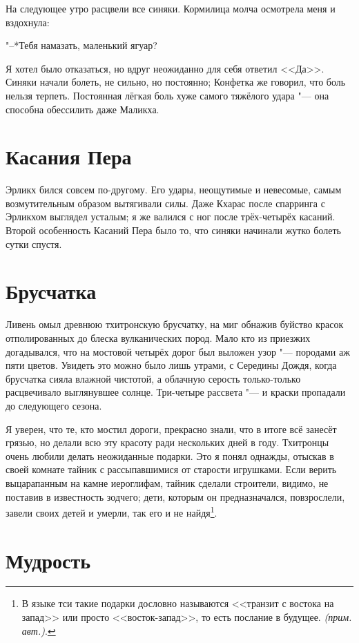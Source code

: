 \documentclass[a4paper,10pt]{book}
\newcommand{\authornote}{\textit{(прим. авт.)}}
\begin{document}
 На следующее утро расцвели все синяки. Кормилица молча осмотрела меня и вздохнула:

"--*Тебя намазать, маленький ягуар?

Я хотел было отказаться, но вдруг неожиданно для себя ответил <<Да>>.
Синяки начали болеть, не сильно, но постоянно;
Конфетка же говорил, что боль нельзя терпеть. Постоянная лёгкая боль хуже самого тяжёлого удара "--- она способна обессилить даже Маликха.

 
 \section{Касания Пера}

 Эрликх бился совсем по-другому. Его удары, неощутимые и невесомые, самым возмутительным образом вытягивали силы. Даже Кхарас после спарринга с Эрликхом выглядел усталым; я же валился с ног после трёх-четырёх касаний. Второй особенность Касаний Пера было то, что синяки начинали жутко болеть сутки спустя.

 
 \section{Брусчатка}

Ливень омыл древнюю тхитронскую брусчатку, на миг обнажив буйство красок отполированных 
до блеска вулканических пород. Мало кто из приезжих догадывался, что на мостовой 
четырёх дорог был выложен узор "--- породами аж пяти цветов. Увидеть это 
можно было лишь утрами, с Середины Дождя, когда брусчатка сияла влажной 
чистотой, а облачную серость только-только расцвечивало выглянувшее солнце. Три-четыре 
рассвета "--- и краски пропадали до следующего сезона.

Я уверен, что те, кто мостил дороги, прекрасно знали, что в итоге всё занесёт грязью, но делали всю эту красоту ради нескольких дней в году. Тхитронцы очень любили делать неожиданные подарки. Это я понял однажды, отыскав в своей комнате  тайник с рассыпавшимися от старости игрушками. Если верить выцарапанным на камне иероглифам, тайник сделали строители, видимо, не поставив в известность зодчего; дети, которым он предназначался, повзрослели, завели своих детей и умерли, так его и не найдя\footnote{В языке тси такие подарки дословно называются <<транзит с востока на запад>> или просто <<восток-запад>>, то есть послание в будущее. \authornote.}.
  
\section{Мудрость}
\end{document}

